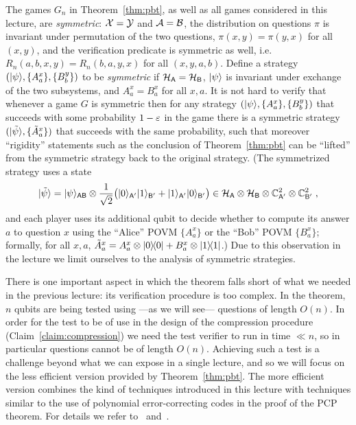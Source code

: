 \begin{remark}\label{rk:symmetric}
The games $G_n$ in Theorem~\ref{thm:pbt}, as well as all games considered in this lecture, are \emph{symmetric}: $\mathcal{X}=\mathcal{Y}$ and $\mathcal{A}=\mathcal{B}$, the distribution on questions $\pi$ is invariant under permutation of the two questions, $\pi(x,y)=\pi(y,x)$ for all $(x,y)$, and the verification predicate is symmetric as well, i.e.\ $R_n(a,b,x,y)=R_n(b,a,y,x)$ for all $(x,y,a,b)$. Define a strategy $(|\psi\rangle,\{A^x_a\},\{B^y_b\})$ to be \emph{symmetric} if $\mathcal{H}_{\textsf{A}}=\mathcal{H}_{\textsf{B}}$, $|\psi\rangle$ is invariant under exchange of the two subsystems, and $A^x_a = B^x_a$ for all $x,a$. 
It is not hard to verify that whenever a game $G$ is symmetric then for any strategy $(|\psi\rangle,\{A^x_a\},\{B^y_b\})$ that succeeds with some probability $1-\varepsilon$ in the game there is a symmetric strategy $(|\tilde{\psi}\rangle,\{\tilde{A}^x_a\})$ that succeeds with the same probability, such that moreover ``rigidity'' statements such as the conclusion of Theorem~\ref{thm:pbt} can be ``lifted'' from the symmetric strategy back to the original strategy. (The symmetrized strategy uses a state 
\[ |\tilde{\psi}\rangle = |\psi\rangle_{{\textsf{AB}}} \otimes \frac{1}{\sqrt{2}}\big( |0\rangle_{{\textsf{A}}'}|1\rangle_{{\textsf{B}}'} +  |1\rangle_{{\textsf{A}}'}|0\rangle_{{\textsf{B}}'}\big) \in \mathcal{H}_{\textsf{A}} \otimes \mathcal{H}_{\textsf{B}} \otimes \mathbb{C}^2_{{\textsf{A}}'} \otimes \mathbb{C}^2_{{\textsf{B}}'}\;,\]
and each player uses its additional qubit to decide whether to compute its answer $a$ to question $x$ using the ``Alice'' POVM $\{A^x_a\}$ or the ``Bob'' POVM $\{B^x_a\}$; formally, for all $x,a$, $\tilde{A}^x_a = A^x_a \otimes |0\rangle\!\langle0| + B^x_a \otimes |1\rangle\!\langle1|$.)   
Due to this observation in the lecture we limit ourselves to the analysis of symmetric strategies. 
\end{remark}

There is one important aspect in which the theorem falls short of what we needed in the previous lecture: its verification procedure is too complex. In the theorem, $n$ qubits are being tested using ---as we will see--- questions of length $O(n)$. In order for the test to be of use in the design of the compression procedure (Claim~\ref{claim:compression}) we need the test verifier to run in time $\ll n$, so in particular questions cannot be of length $O(n)$. Achieving such a test is a challenge beyond what we can expose in a single lecture, and so we will focus on the less efficient version provided by Theorem~\ref{thm:pbt}. The more efficient version combines the kind of techniques introduced in this lecture with techniques similar to the use of polynomial error-correcting codes in the proof of the PCP theorem. For details we refer to~\cite{ji2020quantum} and~\cite[Appendix A]{ji2020mip}. 

